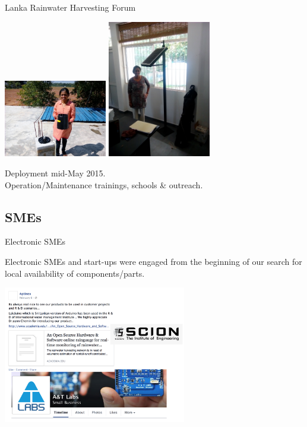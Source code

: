 \documentclass[xcolor=dvipsnames,beamer,unknownkeysallowed]{beamer} %
\begin{document}
\begin{frame}[fragile]{Lanka Rainwater Harvesting Forum}
\begin{center}
 \includegraphics[width=4.5cm]{tanuja1}
  \hspace{5mm}
 \includegraphics[width=4.5cm]{tanuja2}\\
\end{center}

\begin{center}
Deployment mid-May 2015. \\
Operation/Maintenance trainings, schools \& outreach.
\end{center}

\end{frame}

\subsection{SMEs}
\begin{frame}[fragile]{Electronic SMEs}

Electronic SMEs and start-ups were engaged from the beginning of our search for local availability of components/parts.

\begin{center}
  \includegraphics[width=8cm]{LK_SMEs}
\end{center}

\end{frame}
\end{document}
